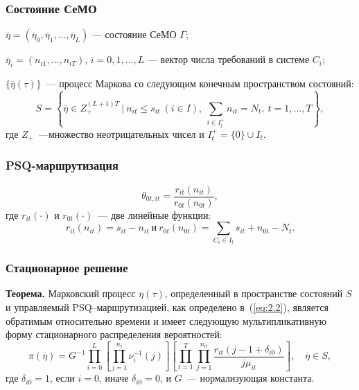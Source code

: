 
\begin{frame} \frametitle{Состояние СеМО}
$\overline{\eta} = (\overline{\eta}_0, \overline{\eta}_1,...,\overline{\eta}_L)$ --- состояние СеМО $\Gamma$;

$\overline{\eta}_i = (n_{i1},...,n_{iT})$, $i=0,1,...,L$ --- вектор числа требований в системе $C_i$;

$\{ \overline{\eta}(\tau) \}$~--- процесс Маркова со следующим конечным пространством состояний:
\begin{equation}
 S = \left\lbrace \overline{\eta} \in Z_+^{(L+1)T} ~|~ n_{it} \leqslant s_{it} ~ (i \in I), ~
 \sum_{i \in I_t^+} n_{it} = N_{t}, ~ t=1,...,T \right\rbrace ,
 \label{eq:2.1}
\end{equation}
где $Z_+$~---множество неотрицательных чисел и $I_t^+ = \{ 0 \} \cup I_t$.
\end{frame}


\begin{frame} \frametitle{PSQ-маршрутизация}
\begin{equation}
 \theta_{0t,it} = \frac{r_{it}(n_{it})} {r_{0t}(n_{0t})},
\label{eq:2.2}
\end{equation}
где $r_{it}(\cdot)$ и $r_{0t}(\cdot)$~--- две линейные функции:
\begin{equation*}
 r_{it}(n_{it}) = s_{it} - n_{it} ~ \text{и} ~ r_{0t}(n_{0t}) = \sum_{C_i \in I_t} s_{it} + n_{0t} - N_t .
\end{equation*}
\end{frame}


\begin{frame} \frametitle{Стационарное решение}
\textbf{Теорема.} Марковский процесс $\overline{\eta}(\tau)$, определенный в пространстве состояний $S$ и управляемый PSQ--маршрутизацией, как определено в~(\ref{eq:2.2}), является обратимым относительно времени и имеет следующую мультипликативную форму стационарного распределения вероятностей:
 \begin{equation}
  \pi(\overline{\eta}) = G^{-1} \prod_{i=0}^L \left[ \prod_{j=1}^{n_i} \nu_i^{-1} (j) \right]
  \left[ \prod_{t=1}^T \prod_{j=1}^{n_{it}} \frac{r_{it} (j - 1 + \delta_{i0})}{j\mu_{it}} \right], \quad \overline{\eta} \in S ,
  \label{eq:2.4}
 \end{equation}
где $\delta_{i0}=1$, если $i=0$, иначе $\delta_{i0}=0$, и $G$~--- нормализующая константа.
\end{frame}

